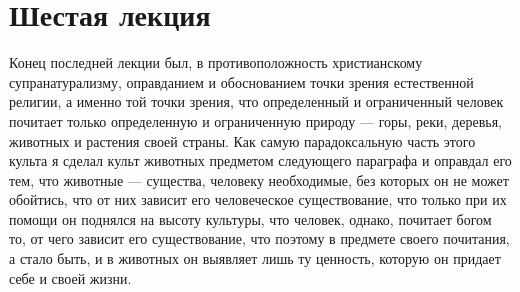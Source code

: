 \documentclass[12pt]{article}
\begin{document}
{}
\section*{Шестая лекция}

Конец последней лекции был, в противоположность христианскому супранатурализму, оправданием и обоснованием точки зрения естественной религии, а именно той точки зрения, что определенный и ограниченный человек почитает только определенную и ограниченную природу --- горы, реки, деревья, животных и растения своей страны. Как самую парадоксальную часть этого культа я сделал культ животных предметом следующего параграфа и оправдал его тем, что животные --- существа, человеку необходимые, без которых он не может обойтись, что от них зависит его человеческое существование, что только при их помощи он поднялся на высоту культуры, что человек, однако, почитает богом то, от чего зависит его существование, что поэтому в предмете своего почитания, а стало быть, и в животных он выявляет лишь ту ценность, которую он придает себе и своей жизни. 
\end{document}
